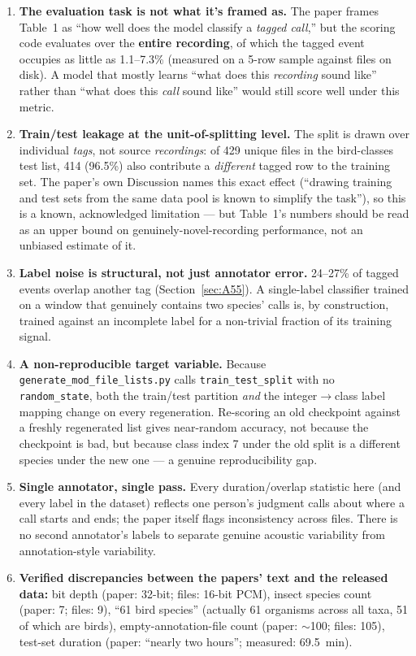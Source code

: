 \documentclass[11pt]{article}
\begin{document}
\begin{enumerate}
\item \textbf{The evaluation task is not what it's framed as.} The paper
  frames Table~1 as ``how well does the model classify a \emph{tagged
  call},'' but the scoring code evaluates over the \textbf{entire
  recording}, of which the tagged event occupies as little as 1.1--7.3\%
  (measured on a 5-row sample against files on disk). A model that mostly
  learns ``what does this \emph{recording} sound like'' rather than ``what
  does this \emph{call} sound like'' would still score well under this
  metric.

\item \textbf{Train/test leakage at the unit-of-splitting level.} The split
  is drawn over individual \emph{tags}, not source \emph{recordings}: of 429
  unique files in the bird-classes test list, 414 (96.5\%) also contribute a
  \emph{different} tagged row to the training set. The paper's own
  Discussion names this exact effect (``drawing training and test sets from
  the same data pool is known to simplify the task''), so this is a known,
  acknowledged limitation --- but Table~1's numbers should be read as an
  upper bound on genuinely-novel-recording performance, not an unbiased
  estimate of it.

\item \textbf{Label noise is structural, not just annotator error.}
  24--27\% of tagged events overlap another tag (Section~\ref{sec:A55}). A
  single-label classifier trained on a window that genuinely contains two
  species' calls is, by construction, trained against an incomplete label
  for a non-trivial fraction of its training signal.

\item \textbf{A non-reproducible target variable.} Because
  \texttt{generate\_mod\_file\_lists.py} calls \texttt{train\_test\_split}
  with no \texttt{random\_state}, both the train/test partition \emph{and}
  the integer$\to$class label mapping change on every regeneration.
  Re-scoring an old checkpoint against a freshly regenerated list gives
  near-random accuracy, not because the checkpoint is bad, but because class
  index 7 under the old split is a different species under the new one --- a
  genuine reproducibility gap.

\item \textbf{Single annotator, single pass.} Every duration/overlap
  statistic here (and every label in the dataset) reflects one person's
  judgment calls about where a call starts and ends; the paper itself flags
  inconsistency across files. There is no second annotator's labels to
  separate genuine acoustic variability from annotation-style variability.

\item \textbf{Verified discrepancies between the papers' text and the
  released data:} bit depth (paper: 32-bit; files: 16-bit PCM), insect
  species count (paper: 7; files: 9), ``61 bird species'' (actually 61
  organisms across all taxa, 51 of which are birds), empty-annotation-file
  count (paper: $\sim$100; files: 105), test-set duration (paper: ``nearly
  two hours''; measured: 69.5~min).
\end{enumerate}
\end{document}
